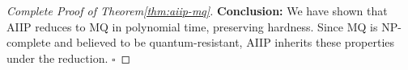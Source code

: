\begin{proof}[Complete Proof of Theorem\ref{thm:aiip-mq}]
    \textbf{Conclusion:}
        We have shown that AIIP reduces to MQ in polynomial time, preserving hardness. Since MQ is NP-complete and believed to be quantum-resistant, AIIP inherits these properties 
        under the reduction. $\square$
\end{proof}


